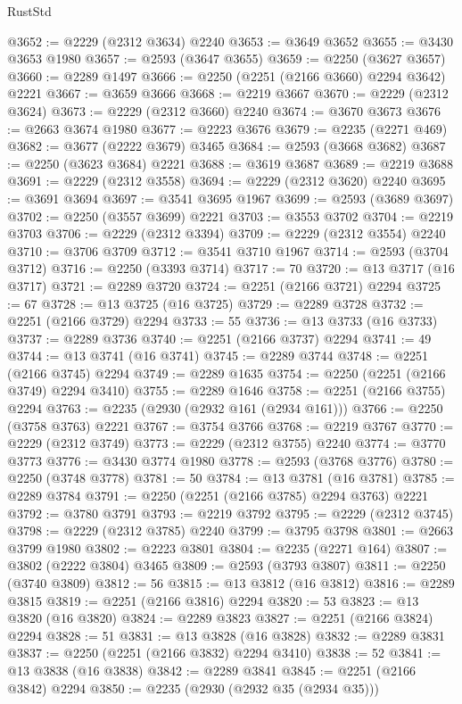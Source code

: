 \begin{lexlean}{RustStd}
\begin{coremodule}
{\begin{coremodule}
{{{{{{{{{{{{{{{{{{{{{{{{{{{{{{{{{{{{{{{{{{{{{{{{{{{{{@3652 := @2229 (@2312 @3634) @2240
@3653 := @3649 @3652
@3655 := @3430 @3653 @1980
@3657 := @2593 (@3647 @3655)
@3659 := @2250 (@3627 @3657)
@3660 := @2289 @1497
@3666 := @2250 (@2251 (@2166 @3660) @2294 @3642) @2221
@3667 := @3659 @3666
@3668 := @2219 @3667
@3670 := @2229 (@2312 @3624)
@3673 := @2229 (@2312 @3660) @2240
@3674 := @3670 @3673
@3676 := @2663 @3674 @1980
@3677 := @2223 @3676
@3679 := @2235 (@2271 @469)
@3682 := @3677 (@2222 @3679) @3465
@3684 := @2593 (@3668 @3682)
@3687 := @2250 (@3623 @3684) @2221
@3688 := @3619 @3687
@3689 := @2219 @3688
@3691 := @2229 (@2312 @3558)
@3694 := @2229 (@2312 @3620) @2240
@3695 := @3691 @3694
@3697 := @3541 @3695 @1967
@3699 := @2593 (@3689 @3697)
@3702 := @2250 (@3557 @3699) @2221
@3703 := @3553 @3702
@3704 := @2219 @3703
@3706 := @2229 (@2312 @3394)
@3709 := @2229 (@2312 @3554) @2240
@3710 := @3706 @3709
@3712 := @3541 @3710 @1967
@3714 := @2593 (@3704 @3712)
@3716 := @2250 (@3393 @3714)
@3717 := 70
@3720 := @13 @3717 (@16 @3717)
@3721 := @2289 @3720
@3724 := @2251 (@2166 @3721) @2294
@3725 := 67
@3728 := @13 @3725 (@16 @3725)
@3729 := @2289 @3728
@3732 := @2251 (@2166 @3729) @2294
@3733 := 55
@3736 := @13 @3733 (@16 @3733)
@3737 := @2289 @3736
@3740 := @2251 (@2166 @3737) @2294
@3741 := 49
@3744 := @13 @3741 (@16 @3741)
@3745 := @2289 @3744
@3748 := @2251 (@2166 @3745) @2294
@3749 := @2289 @1635
@3754 := @2250 (@2251 (@2166 @3749) @2294 @3410)
@3755 := @2289 @1646
@3758 := @2251 (@2166 @3755) @2294
@3763 := @2235 (@2930 (@2932 @161 (@2934 @161)))
@3766 := @2250 (@3758 @3763) @2221
@3767 := @3754 @3766
@3768 := @2219 @3767
@3770 := @2229 (@2312 @3749)
@3773 := @2229 (@2312 @3755) @2240
@3774 := @3770 @3773
@3776 := @3430 @3774 @1980
@3778 := @2593 (@3768 @3776)
@3780 := @2250 (@3748 @3778)
@3781 := 50
@3784 := @13 @3781 (@16 @3781)
@3785 := @2289 @3784
@3791 := @2250 (@2251 (@2166 @3785) @2294 @3763) @2221
@3792 := @3780 @3791
@3793 := @2219 @3792
@3795 := @2229 (@2312 @3745)
@3798 := @2229 (@2312 @3785) @2240
@3799 := @3795 @3798
@3801 := @2663 @3799 @1980
@3802 := @2223 @3801
@3804 := @2235 (@2271 @164)
@3807 := @3802 (@2222 @3804) @3465
@3809 := @2593 (@3793 @3807)
@3811 := @2250 (@3740 @3809)
@3812 := 56
@3815 := @13 @3812 (@16 @3812)
@3816 := @2289 @3815
@3819 := @2251 (@2166 @3816) @2294
@3820 := 53
@3823 := @13 @3820 (@16 @3820)
@3824 := @2289 @3823
@3827 := @2251 (@2166 @3824) @2294
@3828 := 51
@3831 := @13 @3828 (@16 @3828)
@3832 := @2289 @3831
@3837 := @2250 (@2251 (@2166 @3832) @2294 @3410)
@3838 := 52
@3841 := @13 @3838 (@16 @3838)
@3842 := @2289 @3841
@3845 := @2251 (@2166 @3842) @2294
@3850 := @2235 (@2930 (@2932 @35 (@2934 @35)))
}}}}}}}}}}}}}}}}}}}}}}}}}}}}}}}}}}}}}}}}}}}}}}}}}}}}}
\end{coremodule}}
\end{coremodule}
\end{lexlean}
